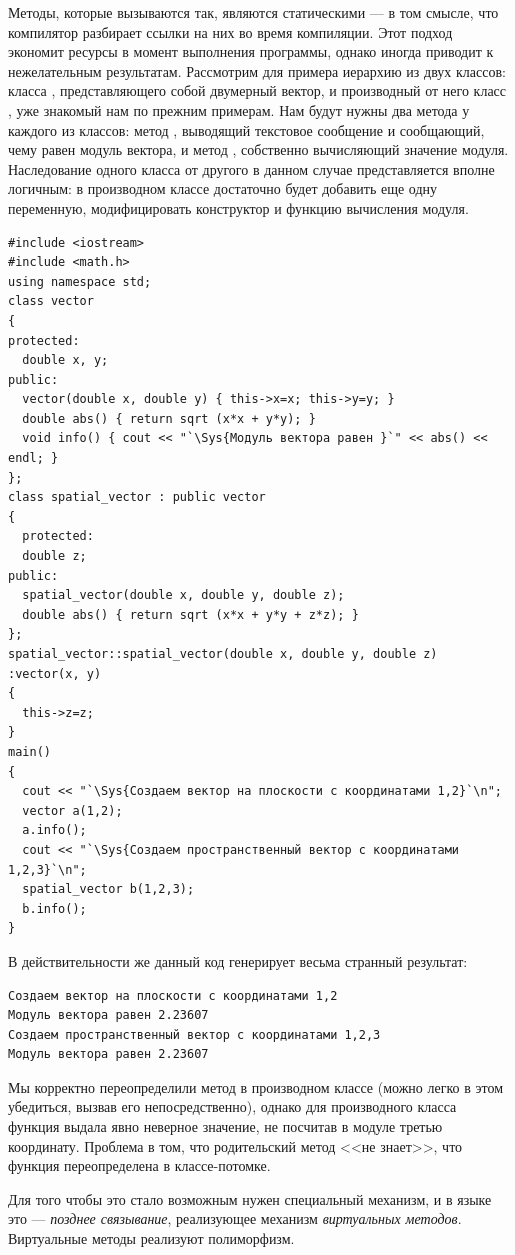 Методы, которые вызываются так, являются статическими --- в том смысле, что компилятор разбирает ссылки на них во время
компиляции. Этот подход экономит ресурсы в момент выполнения программы, однако иногда приводит к нежелательным
результатам. Рассмотрим для примера иерархию из двух классов: класса , представляющего
собой двумерный вектор, и производный от него класс , уже знакомый нам по прежним
примерам. Нам будут нужны два метода у каждого из классов: метод , выводящий текстовое
сообщение и сообщающий, чему равен модуль вектора, и метод , собственно вычисляющий значение
модуля. Наследование одного класса от другого в данном случае представляется вполне логичным: в производном классе
достаточно будет добавить еще одну переменную, модифицировать конструктор и функцию вычисления модуля.
\begin{lstlisting}
#include <iostream>
#include <math.h>
using namespace std;
class vector 
{
protected:
  double x, y;
public:
  vector(double x, double y) { this->x=x; this->y=y; }
  double abs() { return sqrt (x*x + y*y); }
  void info() { cout << "`\Sys{Модуль вектора равен }`" << abs() << endl; }
};
class spatial_vector : public vector 
{
  protected:
  double z;
public:
  spatial_vector(double x, double y, double z);
  double abs() { return sqrt (x*x + y*y + z*z); }
};
spatial_vector::spatial_vector(double x, double y, double z) :vector(x, y) 
{
  this->z=z;
}
main() 
{
  cout << "`\Sys{Создаем вектор на плоскости с координатами 1,2}`\n";
  vector a(1,2);
  a.info();
  cout << "`\Sys{Создаем пространственный вектор с координатами 1,2,3}`\n";
  spatial_vector b(1,2,3);
  b.info();
}
\end{lstlisting}

В действительности же данный код генерирует весьма странный результат:
\begin{verbatim}
Создаем вектор на плоскости с координатами 1,2 
Модуль вектора равен 2.23607 
Создаем пространственный вектор с координатами 1,2,3 
Модуль вектора равен 2.23607
\end{verbatim}
Мы корректно переопределили метод  в производном классе (можно легко в этом убедиться, вызвав
его непосредственно), однако для производного класса функция  выдала явно неверное
значение, не посчитав в модуле третью координату. Проблема в том, что родительский метод 
<<не знает>>, что функция  переопределена в классе-потомке.

Для того чтобы это стало возможным нужен специальный механизм, и в языке  это --- \emph{позднее связывание}, реализующее механизм \emph{виртуальных
методов}. Виртуальные методы реализуют полиморфизм.

